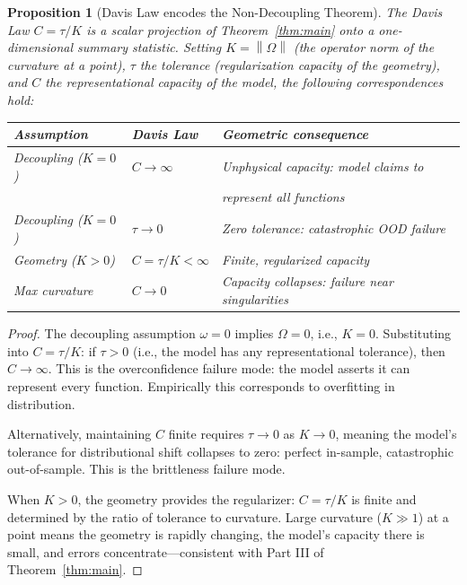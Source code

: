 \documentclass[12pt]{amsart}
\theoremstyle{plain}
\newtheorem{proposition}[theorem]{Proposition}
\theoremstyle{definition}
\newcommand{\norm}[1]{\left\lVert #1 \right\rVert}
\begin{document}
\begin{proposition}[Davis Law encodes the Non-Decoupling Theorem]
\label{prop:davis-law}
The Davis Law $C = \tau / K$ is a scalar projection of
Theorem~\ref{thm:main} onto a one-dimensional summary statistic. Setting
$K = \norm{\Omega}$ (the operator norm of the curvature at a point),
$\tau$ the \emph{tolerance} (regularization capacity of the geometry), and
$C$ the \emph{representational capacity} of the model, the following
correspondences hold:

\begin{center}
\begin{tabular}{lll}
\hline
\textbf{Assumption} & \textbf{Davis Law} & \textbf{Geometric consequence} \\
\hline
Decoupling ($K = 0$) & $C \to \infty$ & Unphysical capacity: model claims to \\
 & & represent all functions \\
Decoupling ($K = 0$) & $\tau \to 0$ & Zero tolerance: catastrophic OOD failure \\
Geometry ($K > 0$) & $C = \tau/K < \infty$ & Finite, regularized capacity \\
Max curvature & $C \to 0$ & Capacity collapses: failure near singularities \\
\hline
\end{tabular}
\end{center}

\end{proposition}

\begin{proof}
The decoupling assumption $\omega = 0$ implies $\Omega = 0$, i.e., $K = 0$.
Substituting into $C = \tau/K$: if $\tau > 0$ (i.e., the model has any
representational tolerance), then $C \to \infty$. This is the 
overconfidence failure mode: the model asserts it can represent every
function. Empirically this corresponds to overfitting in distribution.

Alternatively, maintaining $C$ finite requires $\tau \to 0$ as $K \to 0$,
meaning the model's tolerance for distributional shift collapses to zero:
perfect in-sample, catastrophic out-of-sample. This is the brittleness
failure mode.

When $K > 0$, the geometry provides the regularizer: $C = \tau / K$ is
finite and determined by the ratio of tolerance to curvature. Large
curvature ($K \gg 1$) at a point means the geometry is rapidly changing,
the model's capacity there is small, and errors concentrate---consistent
with Part III of Theorem~\ref{thm:main}.
\end{proof}
\end{document}
